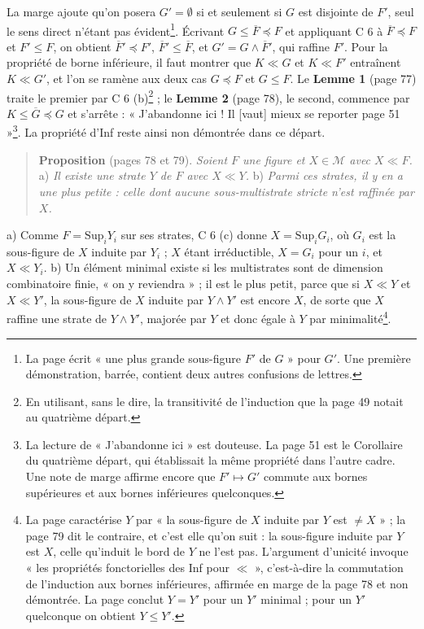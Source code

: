 \documentclass[11pt,a4paper]{article}
\begin{document}
La marge ajoute qu'on posera $G' = \emptyset$ si et seulement si $G$ est
disjointe de $F'$, seul le sens direct n'étant pas évident\footnote{La page
écrit « une plus grande sous-figure $F'$ de $G$ » pour $G'$. Une première
démonstration, barrée, contient deux autres confusions de lettres.}. Écrivant
$G \leq \overline{F} \preccurlyeq F$ et appliquant C 6 à $\overline{F}
\preccurlyeq F$ et $F' \leq F$, on obtient $\overline{F}' \preccurlyeq F'$,
$\overline{F}' \leq \overline{F}$, et $G' = G \wedge \overline{F}'$, qui
raffine $F'$. Pour la propriété de borne inférieure, il faut montrer que $K \ll
G$ et $K \ll F'$ entraînent $K \ll G'$, et l'on se ramène aux deux cas $G
\preccurlyeq F$ et $G \leq F$. Le \textbf{Lemme 1} (page 77) traite le premier
par C 6 (b)\footnote{En utilisant, sans le dire, la transitivité de
l'induction que la page 49 notait au quatrième départ.} ; le \textbf{Lemme 2}
(page 78), le second, commence par $K \leq \overline{G} \preccurlyeq G$ et
s'arrête : « J'abandonne ici ! Il [vaut] mieux se reporter page 51 »\footnote{La
lecture de « J'abandonne ici » est douteuse. La page 51 est le Corollaire du
quatrième départ, qui établissait la même propriété dans l'autre cadre. Une
note de marge affirme encore que $F' \mapsto G'$ commute aux bornes supérieures
et aux bornes inférieures quelconques.}. La propriété d'Inf reste ainsi non
démontrée dans ce départ.

\begin{quote}
\textbf{Proposition} (pages 78 et 79). \emph{Soient $F$ une figure et $X \in
\mathcal{M}$ avec $X \ll F$.} a) \emph{Il existe une strate $Y$ de $F$ avec
$X \ll Y$.} b) \emph{Parmi ces strates, il y en a une plus petite : celle dont
aucune sous-multistrate stricte n'est raffinée par $X$.}
\end{quote}

a) Comme $F = \mathrm{Sup}_{i} Y_{i}$ sur ses strates, C 6 (c) donne $X =
\mathrm{Sup}_{i} G_{i}$, où $G_{i}$ est la sous-figure de $X$ induite par
$Y_{i}$ ; $X$ étant irréductible, $X = G_{i}$ pour un $i$, et $X \ll Y_{i}$.
b) Un élément minimal existe si les multistrates sont de dimension
combinatoire finie, « on y reviendra » ; il est le plus petit, parce que si
$X \ll Y$ et $X \ll Y'$, la sous-figure de $X$ induite par $Y \wedge Y'$ est
encore $X$, de sorte que $X$ raffine une strate de $Y \wedge Y'$, majorée par
$Y$ et donc égale à $Y$ par minimalité\footnote{La page caractérise $Y$ par
« la sous-figure de $X$ induite par $Y$ est $\neq X$ » ; la page 79 dit le
contraire, et c'est elle qu'on suit : la sous-figure induite par $Y$ est $X$,
celle qu'induit le bord de $Y$ ne l'est pas. L'argument d'unicité invoque « les
propriétés fonctorielles des Inf pour $\ll$ », c'est-à-dire la commutation de
l'induction aux bornes inférieures, affirmée en marge de la page 78 et non
démontrée. La page conclut $Y = Y'$ pour un $Y'$ minimal ; pour un $Y'$
quelconque on obtient $Y \leq Y'$.}.
\end{document}
